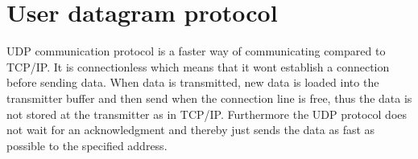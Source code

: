 \section{User datagram protocol}
\gls{UDP} communication protocol is a faster way of communicating compared to TCP/IP. It is connectionless which means that it wont establish a connection before sending data. When data is transmitted, new data is loaded into the transmitter buffer and then send when the connection line is free, thus the data is not stored at the transmitter as in TCP/IP. Furthermore the \gls{UDP} protocol does not wait for an acknowledgment and thereby just sends the data as fast as possible to the specified address.

